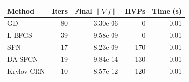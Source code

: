 \begin{tabular}{@{}lrrrr@{}}
\toprule
Method & Iters & Final $\|\nabla f\|$ & HVPs & Time (s) \\
\midrule
GD & 80 & 3.30e-06 & 0 & 0.01 \\
L-BFGS & 39 & 9.58e-09 & 0 & 0.01 \\
SFN & 17 & 8.23e-09 & 170 & 0.01 \\
DA-SFCN & 19 & 9.84e-14 & 130 & 0.01 \\
Krylov-CRN & 10 & 8.57e-12 & 120 & 0.01 \\
\bottomrule
\end{tabular}